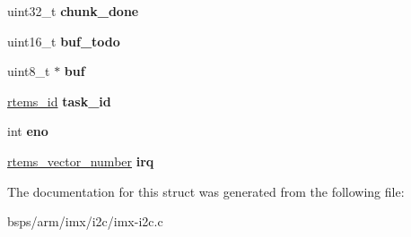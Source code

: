 \begin{DoxyCompactItemize}
uint32\+\_\+t {\bfseries chunk\+\_\+done}
\item 
\mbox{\label{structimx__i2c__bus_ac48e068133b853be1921dfb2a640c351}} 
uint16\+\_\+t {\bfseries buf\+\_\+todo}
\item 
\mbox{\label{structimx__i2c__bus_a08a9e0f2ffd07e37f13012b26ec13ee7}} 
uint8\+\_\+t $\ast$ {\bfseries buf}
\item 
\mbox{\label{structimx__i2c__bus_a3be4c8cfd4a9c070d3432b974d6beb0d}} 
\mbox{\hyperlink{group__ClassicTasks_gab20892b814dced7dd4e5b9bf42becd57}{rtems\+\_\+id}} {\bfseries task\+\_\+id}
\item 
\mbox{\label{structimx__i2c__bus_a04f4c742b263c4746e4d34a3128da84e}} 
int {\bfseries eno}
\item 
\mbox{\label{structimx__i2c__bus_a0053573ece509293661eca8bec80cce0}} 
\mbox{\hyperlink{group__ClassicINTR_ga3e434c197d99f128e78cae4d9358bd8b}{rtems\+\_\+vector\+\_\+number}} {\bfseries irq}
\end{DoxyCompactItemize}


The documentation for this struct was generated from the following file\+:\begin{DoxyCompactItemize}
\item 
bsps/arm/imx/i2c/imx-\/i2c.\+c\end{DoxyCompactItemize}
